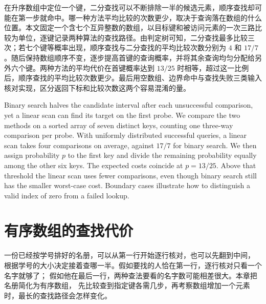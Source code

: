 \documentclass{fduthesis}
\begin{document}
\frontmatter

\makecoverpage
\makecommittee

\tableofcontents

\begin{fdusummary}
在升序数组中定位一个键，二分查找可以不断排除一半的候选元素，顺序查找却可能在第一步就命中。哪一种方法平均比较的次数更少，取决于查询落在数组的什么位置。本文固定一个含七个互异整数的数组，以目标键和被访问元素的一次三路比较为单位，逐键记录两种算法的查找路径。由判定树可知，二分查找最多比较三次；若七个键等概率出现，顺序查找与二分查找的平均比较次数分别为 $4$ 和 $17/7$。随后保持数组顺序不变，逐步提高首键的查询概率，并将其余查询均匀分配给另外六个键。两种方法的平均代价在首键概率达到 $13/25$ 时相等，超过这一比例后，顺序查找的平均比较次数更少。最后用空数组、边界命中与查找失败三类输入核对实现，区分返回下标和比较次数这两个容易混淆的量。
\end{fdusummary}

\begin{fdusummaryen}
Binary search halves the candidate interval after each unsuccessful comparison, yet a
linear scan can find its target on the first probe. We compare the two methods on a
sorted array of seven distinct keys, counting one three-way comparison per probe.
With uniformly distributed successful queries, a linear scan takes four comparisons
on average, against $17/7$ for binary search. We then assign probability $p$ to the
first key and divide the remaining probability equally among the other six keys.
The expected costs coincide at $p=13/25$. Above that threshold the linear scan uses
fewer comparisons, even though binary search still has the smaller worst-case cost.
Boundary cases illustrate how to distinguish a valid index of zero from a failed lookup.
\end{fdusummaryen}

\listoffigures
\listoftables

\mainmatter

\chapter{有序数组的查找代价}
一份已经按学号排好的名册，可以从第一行开始逐行核对，也可以先翻到中间，
根据学号的大小决定接着查哪一半。假如要找的人恰在第一行，逐行核对只看一个名字就够了；
假如他在最后一行，两种查法要看的名字数可能相差很大。本章把名册简化为有序数组，
先比较查到指定键各需几步，再考察数组增加一个元素时，最长的查找路径会怎样变化。
\end{document}
